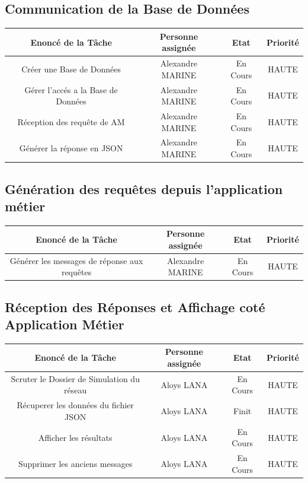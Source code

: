\documentclass[a4paper, 11pt]{article}
\begin{document}
    \subsection{Communication de la Base de Données}
    \begin{center}
    \begin{tabular}{|c|c|c|c|}
        \hline
        Enoncé de la Tâche & Personne assignée & Etat & Priorité\\
        \hline
        \hline
        Créer une Base de Données  & Alexandre MARINE & En Cours & HAUTE \\
        \hline
        Gérer l'accés a la Base de Données  & Alexandre MARINE & En Cours & HAUTE \\
        \hline
        Réception des requête de AM  & Alexandre MARINE & En Cours & HAUTE \\
        \hline
        Générer la réponse en JSON  & Alexandre MARINE & En Cours & HAUTE \\
        \hline
    \end{tabular}
    \end{center}

    \subsection{Génération des requêtes depuis l'application métier}
    \begin{center}
    \begin{tabular}{|c|c|c|c|}
        \hline
        Enoncé de la Tâche & Personne assignée & Etat & Priorité\\
        \hline
        \hline
        Générer les messages de réponse aux requêtes  & Alexandre MARINE & En Cours & HAUTE \\
        \hline
    \end{tabular}
    \end{center}

    \subsection{Réception des Réponses et Affichage coté Application Métier}
    \begin{center}
    \begin{tabular}{|c|c|c|c|}
        \hline
        Enoncé de la Tâche & Personne assignée & Etat & Priorité\\
        \hline
        \hline
        Scruter le Dossier de Simulation du réseau  & Aloys LANA & En Cours & HAUTE \\
        \hline
        Récuperer les données du fichier JSON  & Aloys LANA & Finit & HAUTE \\
        \hline
        Afficher les résultats  & Aloys LANA & En Cours & HAUTE \\
        \hline
        Supprimer les anciens messages  & Aloys LANA & En Cours & HAUTE \\
        \hline
    \end{tabular}
    \end{center}
\end{document}
